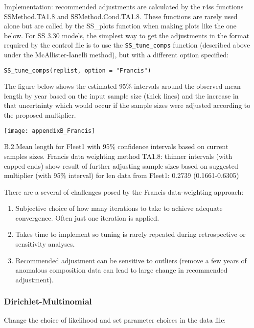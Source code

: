 Implementation: recommended adjustments are calculated by the r4ss functions SSMethod.TA1.8 and SSMethod.Cond.TA1.8. These functions are rarely used alone but are called by the SS\_plots function when making plots like the one below. For SS 3.30 models, the simplest way to get the adjustments in the format required by the control file is to use the \texttt{SS\_tune\_comps} function (described above under the McAllister-Ianelli method), but with a different option specified: 

\texttt{SS\_tune\_comps(replist, option = "Francis")}

The figure below shows the estimated 95\% intervals around the observed mean length by year based on the input sample size (thick lines) and the increase in that uncertainty which would occur if the sample sizes were adjusted according to the proposed multiplier.

\begin{center}
	\texttt{[image: appendixB\_Francis]}\\
\end{center}
\figurename{ B.2.Mean length for Fleet1 with 95\% confidence intervals based on current samples sizes. Francis data weighting method TA1.8: thinner intervals (with capped ends) show result of further adjusting sample sizes based on suggested multiplier (with 95\% interval) for len data from Fleet1: 0.2739 (0.1661-0.6305)}

There are a several of challenges posed by the Francis data-weighting approach:
\begin{enumerate}
	\item Subjective choice of how many iterations to take to achieve adequate convergence. Often just one iteration is applied.
	
	\item Takes time to implement so tuning is rarely repeated during retrospective or sensitivity analyses.
	
	\item Recommended adjustment can be sensitive to outliers (remove a few years of anomalous composition data can lead to large change in recommended adjustment).
\end{enumerate}

\subsubsection{Dirichlet-Multinomial}
Change the choice of likelihood and set parameter choices in the data file:

